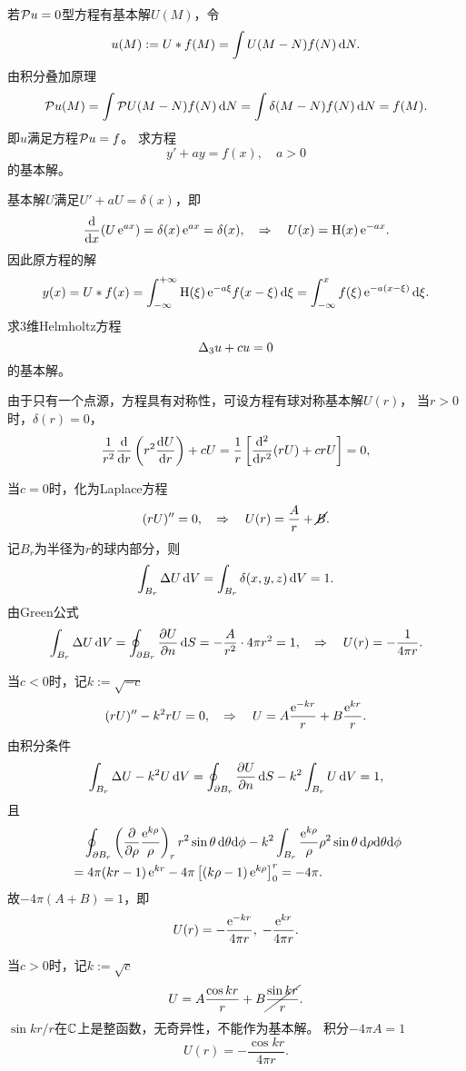若$\mathcal P u=0$型方程有基本解$U(M)$，令
\begin{align}
	u(M):=U\ast f(M)=\int U(M-N)f(N)\mathop{}\!\mathrm{d} N.
\end{align}
由积分叠加原理
\[\mathcal P u(M)=\int\mathcal P U(M-N)f(N)\mathop{}\!\mathrm{d} N=\int\delta(M-N)f(N)\mathop{}\!\mathrm{d} N=f(M).\]
即$u$满足方程$\mathcal P u=f$。
\eg[1] 求方程
\[y'+ay=f(x),\quad a>0\]
的基本解。

基本解$U$满足$U'+aU=\delta(x)$，即
\[\dd x(U\e{ax})=\vd(x)\e{ax}=\delta(x),\thus U(x)=\Heaviside(x)\e{-ax}.\]
因此原方程的解
\[y(x)=U\ast f(x)=\int_{-\infty}^{+\infty}\operatorname{H}(\xi)\mathop{}\!\mathrm{e}^{-a\xi}f(x-\xi)\mathop{}\!\mathrm{d}\xi=\int_{-\infty}^xf(\xi)\mathop{}\!\mathrm{e}^{-a(x-\xi)}\mathop{}\!\mathrm{d}\xi.\]
\eg[2] 求3维Helmholtz方程
\[\Delta_3 u+cu=0\]
的基本解。

由于只有一个点源，方程具有对称性，可设方程有球对称基本解$U(r)$，
当$r>0$时，$\delta(r)=0$，
\[\frac1{r^2}\dd r\kh{r^2\dv Ur}+cU=\frac1r\fkh{\dd[2]r(rU)+crU}=0,\]

当$c=0$时，化为Laplace方程
\[(rU)''=0,\quad\Rightarrow\quad U(r)=\frac Ar+\cancel{B}.\]
记$B_r$为半径为$r$的球内部分，则
\[\int_{B_r}\Delta U\mathop{}\!\mathrm{d} V=\int_{B_r}\delta(x,y,z)\mathop{}\!\mathrm{d} V=1.\]
由Green公式
\[\int_{B_r}\Delta U\mathop{}\!\mathrm{d} V=\oint_{\partial B_r}\frac{\partial^{\;\!\!}U}{\partial n^{\;\!\!}}\mathop{}\!\mathrm{d} S=-\frac A{r^2}\cdot 4\pi r^2=1,\quad\Rightarrow\quad U(r)=-\frac1{4\pi r}.\]

当$c<0$时，记$k:=\sqrt{-c}$
\[(rU)''-k^2rU=0,\quad\Rightarrow\quad U=A\frac{\mathop{}\!\mathrm{e}^{-kr}}r+B\frac{\mathop{}\!\mathrm{e}^{kr}}r.\]
由积分条件
\[\int_{B_r}\Delta U-k^2U\mathop{}\!\mathrm{d} V=\oint_{\partial B_r}\frac{\partial^{\;\!\!}U}{\partial n^{\;\!\!}}\mathop{}\!\mathrm{d} S-k^2\int_{B_r}U\mathop{}\!\mathrm{d} V=1,\]
且
\begin{align*}
	&\quad\oint_{\p B_r}\kh{\pp\rho\frac{\e{k\rho}}\rho}_rr^2\sin\theta\d\theta\nd\phi-k^2\int_{B_r}\frac{\e{k\rho}}\rho\rho^2\sin\theta\d\rho\nd\theta\nd\phi\\
	&=4\pi(kr-1)\e{kr}-4\pi\fkh{(k\rho-1)\e{k\rho}}_0^r=-4\pi.
\end{align*}
故$-4\pi(A+B)=1$，即
\[U(r)=-\frac{\mathop{}\!\mathrm{e}^{-kr}}{4\pi r},\;-\frac{\mathop{}\!\mathrm{e}^{kr}}{4\pi r}.\]

当$c>0$时，记$k:=\sqrt c$
\[U=A\frac{\cos kr}r+B\cancel{\frac{\sin kr}r}.\]
$\sin kr/r$在$\mathbb C$上是整函数，无奇异性，不能作为基本解。
积分$-4\pi A=1$
\[U(r)=-\frac{\cos kr}{4\pi r}.\]
